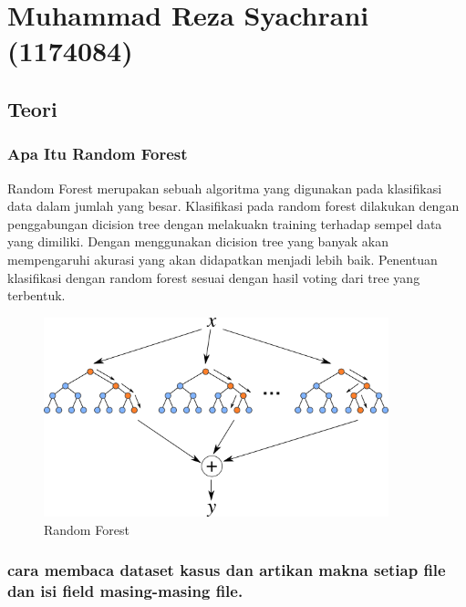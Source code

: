 \section{Muhammad Reza Syachrani (1174084)}
\subsection{Teori}

\subsubsection{Apa Itu Random Forest}

\hfill\break
Random Forest merupakan sebuah algoritma yang digunakan pada klasifikasi data dalam jumlah yang besar. Klasifikasi pada random forest dilakukan dengan penggabungan dicision tree dengan melakuakn training terhadap sempel data yang dimiliki. Dengan menggunakan dicision tree yang banyak akan mempengaruhi akurasi yang akan didapatkan menjadi lebih baik. Penentuan klasifikasi dengan random forest sesuai dengan hasil voting dari tree yang terbentuk.
\begin{figure}[H]
\centerline{\includegraphics[width=10cm]{figures/1174084/3/1.png}}
\caption{Random Forest}
\label{labelgambar}
\end{figure}

\subsubsection{cara membaca dataset kasus dan artikan makna setiap file dan isi field masing-masing file.}

